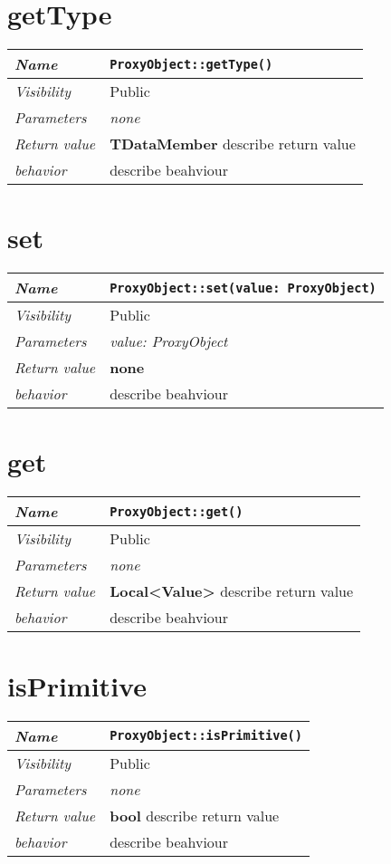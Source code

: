  \section{getType}
\begin{longtable}{p{3cm} @{\hskip 1cm} p{12cm}}
 \hline
\textit{Name} & \texttt{ProxyObject::getType()}\\
\hline
 \textit{Visibility} & Public \\
\hline
\textit{Parameters} & \textit{none}\\
\hline
\textit{Return value} & \textbf{ TDataMember} describe return value\\
  \hline
 \textit{behavior} & describe beahviour \\
\hline
\end{longtable} \pagebreak
 \section{set}
\begin{longtable}{p{3cm} @{\hskip 1cm} p{12cm}}
 \hline
\textit{Name} & \texttt{ProxyObject::set(value: ProxyObject)}\\
\hline
 \textit{Visibility} & Public \\
\hline
\textit{Parameters} & \textit{value: ProxyObject}\\
\hline
\textit{Return value} & \textbf{none}\\
  \hline
 \textit{behavior} & describe beahviour \\
\hline
\end{longtable} \pagebreak
 \section{get}
\begin{longtable}{p{3cm} @{\hskip 1cm} p{12cm}}
 \hline
\textit{Name} & \texttt{ProxyObject::get()}\\
\hline
 \textit{Visibility} & Public \\
\hline
\textit{Parameters} & \textit{none}\\
\hline
\textit{Return value} & \textbf{ Local<Value>} describe return value\\
  \hline
 \textit{behavior} & describe beahviour \\
\hline
\end{longtable} \pagebreak
 \section{isPrimitive}
\begin{longtable}{p{3cm} @{\hskip 1cm} p{12cm}}
 \hline
\textit{Name} & \texttt{ProxyObject::isPrimitive()}\\
\hline
 \textit{Visibility} & Public \\
\hline
\textit{Parameters} & \textit{none}\\
\hline
\textit{Return value} & \textbf{ bool} describe return value\\
  \hline
 \textit{behavior} & describe beahviour \\
\hline
\end{longtable} \pagebreak
